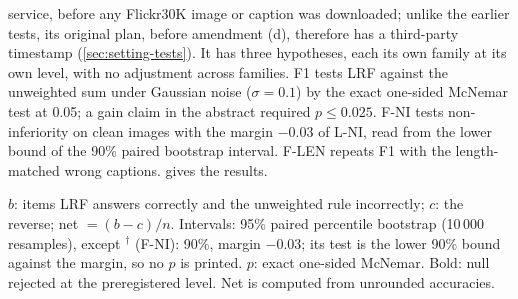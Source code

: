 service, before any Flickr30K image or caption was downloaded; unlike the earlier tests, its original plan, before amendment (d), therefore has a third-party timestamp
(\cref{sec:setting-tests}).
It has three hypotheses, each its own family at its own level, with no adjustment across families.
F1 tests LRF against the unweighted sum under Gaussian noise ($\sigma=0.1$) by the exact one-sided McNemar test at 0.05; a gain claim in the
abstract required $p\le0.025$.
F-NI tests non-inferiority on clean images with the margin $-0.03$ of L-NI, read from the lower bound of the 90\% paired bootstrap interval.
F-LEN repeats F1 with the length-matched wrong captions.
 gives the results.

\begin{table}[!t]
\centering
\caption{Transfer to Flickr30K ($n=872$): Accuracy Without and With the Frozen LRF, Discordant Counts, $p$-Values, and Decisions}
\label{tab:f30k}
\footnotesize
\setlength{\tabcolsep}{3pt}
\resizebox{\columnwidth}{!}{}

\vspace{2pt}
\parbox{\columnwidth}{\scriptsize $b$: items LRF answers correctly and the unweighted rule incorrectly; $c$: the reverse; net $=(b-c)/n$.
Intervals: 95\% paired percentile bootstrap (10\,000 resamples), except $^{\dagger}$ (F-NI): 90\%, margin $-0.03$; its test is the lower 90\%
bound against the margin, so no $p$ is printed. $p$: exact one-sided McNemar. Bold: null rejected at the preregistered level. Net is computed from unrounded accuracies.}
\end{table}

